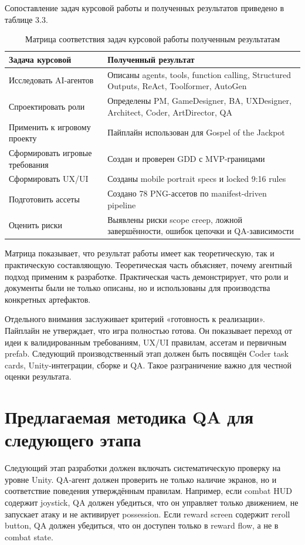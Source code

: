 \documentclass[a4paper,12pt]{report}
\begin{document}
Сопоставление задач курсовой работы и полученных результатов приведено в таблице 3.3.

\begin{table}[H]
\centering
\caption{Матрица соответствия задач курсовой работы полученным результатам}
\small
\begin{tabularx}{\textwidth}{@{}p{}Y@{}}
\toprule
\textbf{Задача курсовой} & \textbf{Полученный результат} \\
\midrule
Исследовать AI-агентов & Описаны agents, tools, function calling, Structured Outputs, ReAct, Toolformer, AutoGen \\
Спроектировать роли & Определены PM, GameDesigner, BA, UXDesigner, Architect, Coder, ArtDirector, QA \\
Применить к игровому проекту & Пайплайн использован для Gospel of the Jackpot \\
Сформировать игровые требования & Создан и проверен GDD с MVP-границами \\
Сформировать UX/UI & Созданы mobile portrait specs и locked 9:16 rules \\
Подготовить ассеты & Создано 78 PNG-ассетов по manifest-driven pipeline \\
Оценить риски & Выявлены риски scope creep, ложной завершённости, ошибок цепочки и QA-зависимости \\
\bottomrule
\end{tabularx}
\end{table}

Матрица показывает, что результат работы имеет как теоретическую, так и практическую составляющую. Теоретическая часть объясняет, почему агентный подход применим к разработке. Практическая часть демонстрирует, что роли и документы были не только описаны, но и использованы для производства конкретных артефактов.

Отдельного внимания заслуживает критерий «готовность к реализации». Пайплайн не утверждает, что игра полностью готова. Он показывает переход от идеи к валидированным требованиям, UX/UI правилам, ассетам и первичным prefab. Следующий производственный этап должен быть посвящён Coder task cards, Unity-интеграции, сборке и QA. Такое разграничение важно для честной оценки результата.

\section{Предлагаемая методика QA для следующего этапа}

Следующий этап разработки должен включать систематическую проверку на уровне Unity. QA-агент должен проверить не только наличие экранов, но и соответствие поведения утверждённым правилам. Например, если combat HUD содержит joystick, QA должен убедиться, что он управляет только движением, не запускает атаку и не активирует possession. Если reward screen содержит reroll button, QA должен убедиться, что он доступен только в reward flow, а не в combat state.
\end{document}
